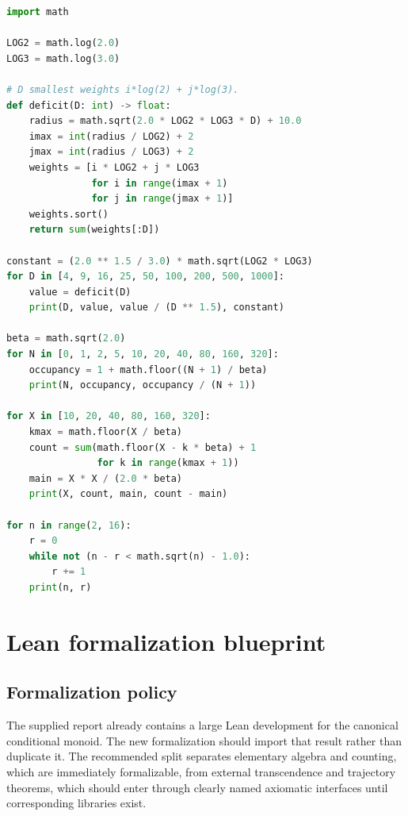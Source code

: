 \documentclass[10pt,oneside]{article}
\theoremstyle{definition}
\theoremstyle{remark}
\begin{document}
\begin{lstlisting}[style=code,language=Python,caption={Reproducing the synthetic counts and deficit table.}]
import math

LOG2 = math.log(2.0)
LOG3 = math.log(3.0)

# D smallest weights i*log(2) + j*log(3).
def deficit(D: int) -> float:
    radius = math.sqrt(2.0 * LOG2 * LOG3 * D) + 10.0
    imax = int(radius / LOG2) + 2
    jmax = int(radius / LOG3) + 2
    weights = [i * LOG2 + j * LOG3
               for i in range(imax + 1)
               for j in range(jmax + 1)]
    weights.sort()
    return sum(weights[:D])

constant = (2.0 ** 1.5 / 3.0) * math.sqrt(LOG2 * LOG3)
for D in [4, 9, 16, 25, 50, 100, 200, 500, 1000]:
    value = deficit(D)
    print(D, value, value / (D ** 1.5), constant)

beta = math.sqrt(2.0)
for N in [0, 1, 2, 5, 10, 20, 40, 80, 160, 320]:
    occupancy = 1 + math.floor((N + 1) / beta)
    print(N, occupancy, occupancy / (N + 1))

for X in [10, 20, 40, 80, 160, 320]:
    kmax = math.floor(X / beta)
    count = sum(math.floor(X - k * beta) + 1
                for k in range(kmax + 1))
    main = X * X / (2.0 * beta)
    print(X, count, main, count - main)

for n in range(2, 16):
    r = 0
    while not (n - r < math.sqrt(n) - 1.0):
        r += 1
    print(n, r)
\end{lstlisting}

\section{Lean formalization blueprint}
\label{sec:lean}

\subsection{Formalization policy}
The supplied report already contains a large Lean development for the canonical conditional monoid.  The new formalization should import that result rather than duplicate it.  The recommended split separates elementary algebra and counting, which are immediately formalizable, from external transcendence and trajectory theorems, which should enter through clearly named axiomatic interfaces until corresponding libraries exist.
\end{document}
